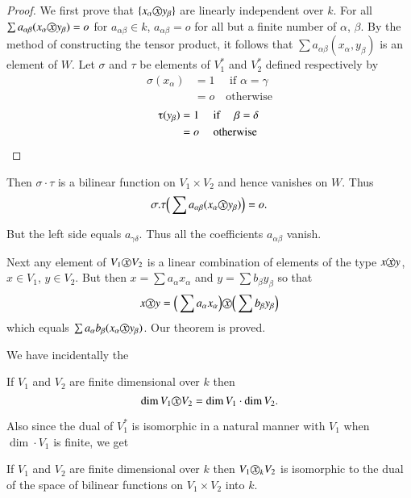 \begin{proof}%
We first prove that $\{ x_\alpha \text{\textcircled{$x$}}  y_\beta \}$ are
linearly independent over $k$. For all $\sum a_{\alpha\beta}
(x_\alpha  \text{\textcircled{$x$}}  y_\beta ) = o$ for $a_{\alpha\beta} \in
 k$, $a_{\alpha\beta} = o$ for all but a finite number of $\alpha$,
$\beta$. By the method of constructing the tensor product, it follows
that $\sum a_{\alpha\beta} (x_\alpha, y_\beta )$ is an element of
$W$. Let $\sigma$ and $\tau$ be elements of $V^*_1$ and $V^*_2$
defined respectively by  
\begin{align*}
\sigma (x_\alpha ) & = 1 \quad \text{ if } \alpha = \gamma \\
& = o  \quad \text{otherwise}
\end{align*}
\begin{align*}
\tauup (y_\beta ) & = 1 \quad \text{ if } \quad \beta = \delta\\
& = o \quad \text{ otherwise }
\end{align*}\pageoriginale
\end{proof}

Then $\sigma \cdot \tau$ is a bilinear function on $V_1 \times V_2$ and
hence vanishes on $W$. Thus 
$$
\sigma.\tau \Big(\sum a_{\alpha \beta} (x_\alpha  \text{\textcircled{$x$}} 
y_\beta)\Big) = o. 
$$

But the left side equals $a_{\gamma\delta}$. Thus all the coefficients
$a_{\alpha\beta}$ vanish. 

Next any element of $V_1  \text{\textcircled{$x$}}  V_2$ is a linear
combination of elements of the type $x  \text{\textcircled{$x$}}  y$, $x \in
V_1$, $y \in V_2$. But then $x = \sum a_\alpha x_\alpha$ and $y = \sum
b_\beta  y_\beta$ so that  
$$
x  \text{\textcircled{$x$}}  y = \Big(\sum a_\alpha  x_\alpha\Big) 
\text{\textcircled{$x$}}  \Big(\sum b_\beta  y_\beta \Big) 
$$
which equals $\sum a_\alpha b_\beta  (x_\alpha \text{\textcircled{$x$}} 
y_\beta )$. Our theorem is proved. 

We have incidentally the 

\begin{coro*} %
If $V_1$ and $V_2$ are finite dimensional over $k$ then 
$$
\dim V_1  \text{\textcircled{$x$}}  V_2 = \dim V_1 \cdot \dim  V_2.
$$
\end{coro*}

Also since the dual of $V_1^*$ is isomorphic in a natural manner with
$V_1$ when $\dim \cdot V_1$ is finite, we get  

\begin{coro*}%
If $V_1$ and $V_2$ are finite dimensional over $k$ then $V_1 
    \text{\textcircled{$x$}}_k  V_2$ is isomorphic to the dual of the space of
    bilinear functions on $V_1 \times V_2$ into $k$. 
\end{coro*}


